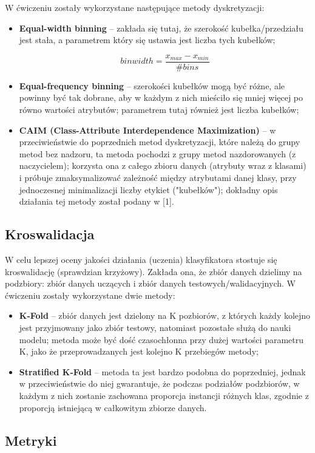         \noindent
        W ćwiczeniu zostały wykorzystane następujące metody dyskretyzacji:
        \begin{itemize}
            \item{\textbf{Equal-width binning} -- zakłada się tutaj, że szerokość kubełka/przedziału jest stała,
                   a parametrem który się ustawia jest liczba tych kubełków;}

             $$ binwidth = \frac{x_{max} - x_{min}}{\#bins} $$

            \item{\textbf{Equal-frequency binning} -- szerokości kubełków mogą być różne, ale powinny być tak
                  dobrane, aby w każdym z nich mieściło się mniej więcej po równo wartości atrybutów; parametrem
                  tutaj również jest liczba kubełków;}

            \item{\textbf{CAIM (Class-Attribute Interdependence Maximization)} -- w przeciwieństwie do poprzednich
                  metod dyskretyzacji, które należą do grupy metod bez nadzoru, ta metoda pochodzi z grupy metod
                  nazdorowanych (z naczycielem); korzysta ona z całego zbioru danych (atrybuty wraz z klasami) i
                  próbuje zmaksymalizować zależność między atrybutami danej klasy, przy jednoczesnej minimalizacji
                  liczby etykiet ("kubełków"); dokładny opis działania tej metody został podany w [1].}
        \end{itemize}

    \subsection{Kroswalidacja}
        W celu lepszej oceny jakości działania (uczenia) klasyfikatora stostuje się kroswalidację (sprawdzian
        krzyżowy). Zakłada ona, że zbiór danych dzielimy na podzbiory: zbiór danych uczących i zbiór danych
        testowych/walidacyjnych. W ćwiczeniu zostały wykorzystane dwie metody:
        \begin{itemize}
            \item{\textbf{K-Fold} -- zbiór danych jest dzielony na K pozbiorów, z których każdy kolejno jest
                  przyjmowany jako zbiór testowy, natomiast pozostałe służą do nauki modelu; metoda może być
                  dość czasochłonna przy dużej wartości parametru K, jako że przeprowadzanych jest kolejno
                  K przebiegów metody;}
            \item{\textbf{Stratified K-Fold} -- metoda ta jest bardzo podobna do poprzedniej, jednak w przeciwieństwie
                  do niej gwarantuje, że podczas podziałów podzbiorów, w każdym z nich zostanie zachowana proporcja
                  instancji różnych klas, zgodnie z proporcją istniejącą w całkowitym zbiorze danych.}
        \end{itemize}


    \subsection{Metryki}